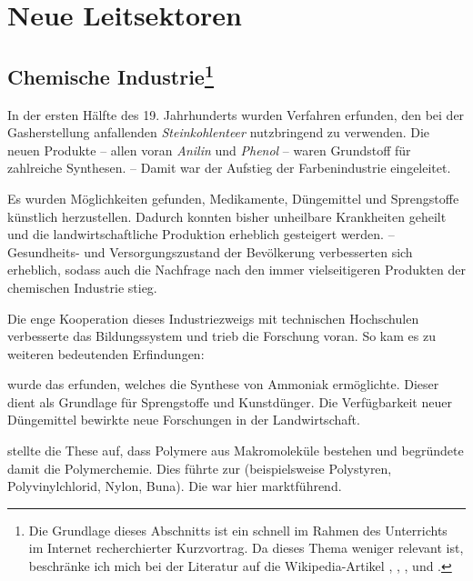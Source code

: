 \section{Neue Leitsektoren}
\label{sec:neue-leits}

\subsection[Chemische Industrie]{Chemische Industrie\footnote{Die
Grundlage dieses Abschnitts ist ein schnell im Rahmen des Unterrichts
im Internet recherchierter Kurzvortrag. Da dieses Thema weniger
relevant ist, beschränke ich mich bei der Literatur auf die
Wikipedia-Artikel \cite{WikChemInd}, \cite{WikFarbst}, \cite{WikHaBoVerf}, \cite{WikStaudi} und \cite{WikSteikohteer}.}}
\label{ssc:chem-ind}

In der ersten Hälfte des 19. Jahrhunderts wurden Verfahren erfunden,
den bei der Gasherstellung anfallenden \emph{Steinkohlenteer}
 nutzbringend zu verwenden. Die neuen Produkte
-- allen voran \emph{Anilin} und \emph{Phenol}
 -- waren Grundstoff für zahlreiche
Synthesen. -- Damit war der Aufstieg der Farbenindustrie eingeleitet.

Es wurden Möglichkeiten gefunden, Medikamente, Düngemittel und
Sprengstoffe künstlich herzustellen. Dadurch konnten bisher unheilbare
Krankheiten geheilt und die landwirtschaftliche Produktion erheblich
gesteigert werden. -- Gesundheits- und Versorgungszustand der
Bevölkerung verbesserten sich erheblich, sodass auch die Nachfrage
nach den immer vielseitigeren Produkten der chemischen Industrie
stieg.

Die enge Kooperation dieses Industriezweigs mit technischen
Hochschulen verbesserte das Bildungssystem und trieb die Forschung
voran. So kam es zu weiteren bedeutenden Erfindungen:

 wurde das   erfunden,
welches die Synthese von Ammoniak ermöglichte. Dieser dient als
Grundlage für Sprengstoffe und Kunstdünger. Die Verfügbarkeit neuer
Düngemittel bewirkte neue Forschungen in der Landwirtschaft.

 stellte  die
These auf, dass Polymere aus Makromoleküle bestehen und begründete
damit die Polymerchemie. Dies führte zur  (beispielsweise
Polystyren, Polyvinylchlorid, Nylon, Buna). Die 
 war hier marktführend.

